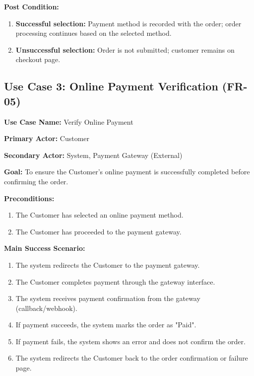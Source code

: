 \textbf{Post Condition:}
\begin{enumerate}
    \item \textbf{Successful selection:} Payment method is recorded with the order; order processing continues based on the selected method.
    \item \textbf{Unsuccessful selection:} Order is not submitted; customer remains on checkout page.
\end{enumerate}

\subsection*{Use Case 3: Online Payment Verification (FR-05)}

\textbf{Use Case Name:} Verify Online Payment

\textbf{Primary Actor:} Customer

\textbf{Secondary Actor:} System, Payment Gateway (External)

\textbf{Goal:} To ensure the Customer's online payment is successfully completed before confirming the order.

\textbf{Preconditions:}
\begin{enumerate}
    \item The Customer has selected an online payment method.
    \item The Customer has proceeded to the payment gateway.
\end{enumerate}

\textbf{Main Success Scenario:}
\begin{enumerate}
    \item The system redirects the Customer to the payment gateway.
    \item The Customer completes payment through the gateway interface.
    \item The system receives payment confirmation from the gateway (callback/webhook).
    \item If payment succeeds, the system marks the order as "Paid".
    \item If payment fails, the system shows an error and does not confirm the order.
    \item The system redirects the Customer back to the order confirmation or failure page.
\end{enumerate}

